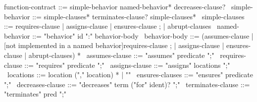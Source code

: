 \begin{syntax}
  function-contract ::= simple-behavior named-behavior* decreases-clause?
  \
  simple-behavior ::= simple-clauses* terminates-clause? simple-clauses*
  \
  simple-clauses ::= requires-clause | assigns-clause | ensures-clause ;
                   | {abrupt-clauses}
  \
  named-behavior ::= "behavior" id ":" behavior-body
  \
  behavior-body ::= (assumes-clause |
                     {[not implemented in a named behavior]requires-clause} ;
                    | assigns-clause | ensures-clause | {abrupt-clauses}) *
              \
  assumes-clause ::= "assumes" predicate ";"
  \
  requires-clause ::= "requires" predicate ";"
  \
  assigns-clause ::= "assigns" locations ";"
  \
  locations ::= location ("," location) * | "\nothing"
  \
  ensures-clauses ::= "ensures" predicate ";"
  \
  decreases-clause ::= "decreases" term ("for" ident)? ";"
  \
  terminates-clause ::= "terminates" pred ";"
\end{syntax}

